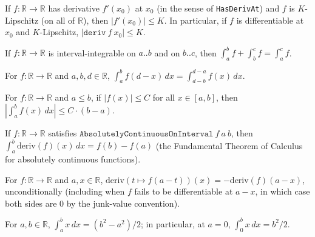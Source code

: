 \begin{proposition}
  If $f : \mathbb{R} \to \mathbb{R}$ has derivative $f'(x_0)$ at $x_0$ (in the sense of
  \texttt{HasDerivAt}) and $f$ is $K$-Lipschitz (on all of $\mathbb{R}$), then $|f'(x_0)| \le K$.
  In particular, if $f$ is differentiable at $x_0$ and $K$-Lipschitz, $|\texttt{deriv}\ f\ x_0| \le K$.
\end{proposition}

\begin{proposition}
  If $f : \mathbb{R} \to \mathbb{R}$ is interval-integrable on $a..b$ and on $b..c$, then
  $\int_a^b f + \int_b^c f = \int_a^c f$.
\end{proposition}

\begin{proposition}
  For $f : \mathbb{R} \to \mathbb{R}$ and $a,b,d \in \mathbb{R}$,
  $\int_a^b f(d - x)\,dx = \int_{d-b}^{d-a} f(x)\,dx$.
\end{proposition}

\begin{proposition}
  For $f : \mathbb{R} \to \mathbb{R}$ and $a \le b$, if $|f(x)| \le C$ for all $x \in [a,b]$, then
  $\left|\int_a^b f(x)\,dx\right| \le C \cdot (b-a)$.
\end{proposition}

\begin{proposition}
  If $f : \mathbb{R} \to \mathbb{R}$ satisfies $\texttt{AbsolutelyContinuousOnInterval}\ f\ a\ b$,
  then $\int_a^b \mathrm{deriv}(f)(x)\,dx = f(b) - f(a)$ (the Fundamental Theorem of Calculus for
  absolutely continuous functions).
\end{proposition}

\begin{proposition}
  For $f : \mathbb{R} \to \mathbb{R}$ and $a,x \in \mathbb{R}$,
  $\mathrm{deriv}(t \mapsto f(a-t))(x) = -\mathrm{deriv}(f)(a-x)$, unconditionally (including when $f$ fails to be
  differentiable at $a-x$, in which case both sides are $0$ by the junk-value convention).
\end{proposition}

\begin{proposition}
  For $a,b \in \mathbb{R}$, $\int_a^b x\,dx = (b^2 - a^2)/2$; in particular, at $a=0$,
  $\int_0^b x\,dx = b^2/2$.
\end{proposition}

